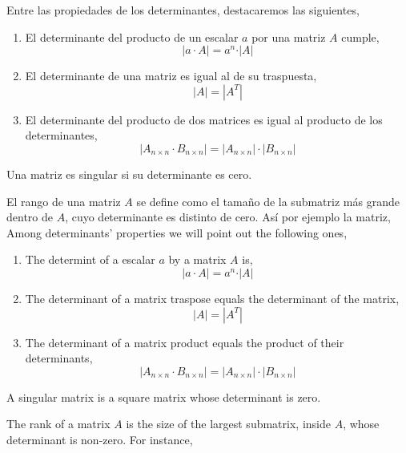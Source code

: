 \begin{paracol}{2}
Entre las propiedades de los determinantes, destacaremos las siguientes,
\begin{enumerate}
\item El determinante del producto de un escalar $a$ por una matriz $A$ cumple,
\begin{equation*}
\left\vert a\cdot A \right\vert =a^n\cdot \vert A \vert
\end{equation*}
\item El determinante de una matriz es igual al de su traspuesta,
\begin{equation*}
\vert A \vert =\left\vert A^T \right\vert
\end{equation*}

\item El determinante del producto de dos matrices es igual al producto de los determinantes,
\begin{equation*}
\left\vert A_{n\times n} \cdot  B_{n\times n} \right\vert = \left\vert A_{n\times n} \right\vert \cdot \left\vert B_{n\times n} \right\vert 
\end{equation*}
\end{enumerate}

Una matriz es singular si su determinante es cero.

El rango de una matriz $A$ se define como el tamaño de la submatriz más grande dentro de $A$, cuyo determinante es distinto de cero. Así por ejemplo la matriz,
\switchcolumn
Among determinants' properties we will point out the following ones,
\begin{enumerate}
	\item The determint of a escalar $a$ by a  matrix $A$ is,
	\begin{equation*}
		\left\vert a\cdot A \right\vert =a^n\cdot \vert A \vert
	\end{equation*}
	\item The determinant of a matrix traspose equals the determinant of the matrix,
	\begin{equation*}
		\vert A \vert =\left\vert A^T \right\vert
	\end{equation*}
	
	\item The determinant of a matrix product equals the product of their determinants,
	\begin{equation*}
		\left\vert A_{n\times n} \cdot  B_{n\times n} \right\vert = \left\vert A_{n\times n} \right\vert \cdot \left\vert B_{n\times n} \right\vert 
	\end{equation*}
\end{enumerate}

A singular matrix is a square matrix whose determinant is zero.

The rank of a matrix $A$ is the size of the largest submatrix, inside $A$, whose determinant is non-zero. For instance,  
\end{paracol}
